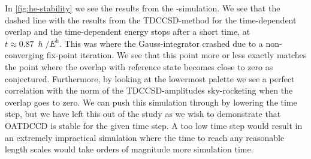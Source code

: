         In \autoref{fig:he-stability} we see the results from the
        -simulation.
        We see that the dashed line with the results from the TDCCSD-method for
        the time-dependent overlap and the time-dependent energy stops after a
        short time, at $t \approx \SI{0.87}{\hslash/\hartree}$.
        This was where the Gauss-integrator crashed due to a non-converging
        fix-point iteration.
        We see that this point more or less exactly matches the point where the
        overlap with reference state becomes close to zero as conjectured.
        Furthermore, by looking at the lowermost palette we see a perfect
        correlation with the norm of the TDCCSD-amplitudes sky-rocketing when
        the overlap goes to zero.
        We can push this simulation through by lowering the time step, but we have
        left this out of the study as we wish to demonstrate that OATDCCD is
        stable for the given time step.
        A too low time step would result in an extremely impractical simulation
        where the time to reach any reasonable length scales would take orders
        of magnitude more simulation time.
